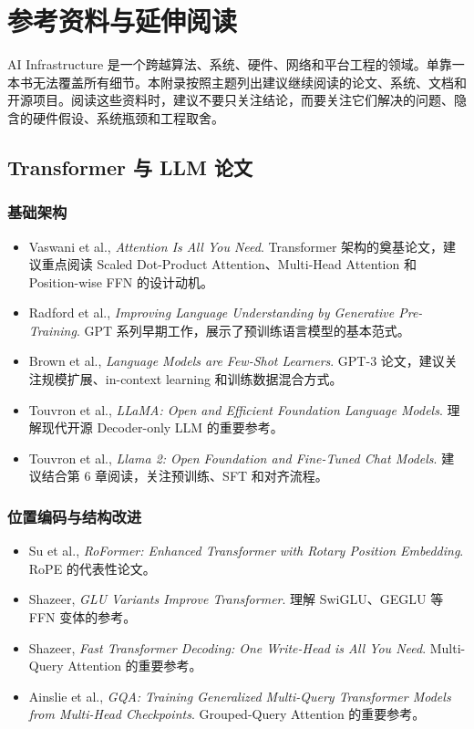 

\chapter{参考资料与延伸阅读}

AI Infrastructure 是一个跨越算法、系统、硬件、网络和平台工程的领域。单靠一本书无法覆盖所有细节。本附录按照主题列出建议继续阅读的论文、系统、文档和开源项目。阅读这些资料时，建议不要只关注结论，而要关注它们解决的问题、隐含的硬件假设、系统瓶颈和工程取舍。

\section{Transformer 与 LLM 论文}

\subsection{基础架构}

\begin{itemize}
\item Vaswani et al., \textit{Attention Is All You Need}. Transformer 架构的奠基论文，建议重点阅读 Scaled Dot-Product Attention、Multi-Head Attention 和 Position-wise FFN 的设计动机。
\item Radford et al., \textit{Improving Language Understanding by Generative Pre-Training}. GPT 系列早期工作，展示了预训练语言模型的基本范式。
\item Brown et al., \textit{Language Models are Few-Shot Learners}. GPT-3 论文，建议关注规模扩展、in-context learning 和训练数据混合方式。
\item Touvron et al., \textit{LLaMA: Open and Efficient Foundation Language Models}. 理解现代开源 Decoder-only LLM 的重要参考。
\item Touvron et al., \textit{Llama 2: Open Foundation and Fine-Tuned Chat Models}. 建议结合第 6 章阅读，关注预训练、SFT 和对齐流程。
\end{itemize}

\subsection{位置编码与结构改进}

\begin{itemize}
\item Su et al., \textit{RoFormer: Enhanced Transformer with Rotary Position Embedding}. RoPE 的代表性论文。
\item Shazeer, \textit{GLU Variants Improve Transformer}. 理解 SwiGLU、GEGLU 等 FFN 变体的参考。
\item Shazeer, \textit{Fast Transformer Decoding: One Write-Head is All You Need}. Multi-Query Attention 的重要参考。
\item Ainslie et al., \textit{GQA: Training Generalized Multi-Query Transformer Models from Multi-Head Checkpoints}. Grouped-Query Attention 的重要参考。
\end{itemize}

